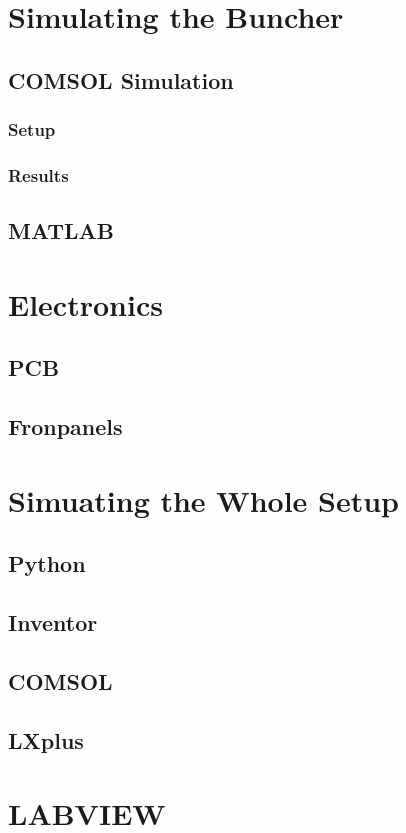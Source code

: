 \documentclass{article}
\begin{document}
\section{Simulating the Buncher}
\subsection{COMSOL Simulation}
\subsubsection{Setup}
\subsubsection{Results}
\subsection{MATLAB}


\section{Electronics}
\subsection{PCB}
\subsection{Fronpanels}


\section{Simuating the Whole Setup}

\subsection{Python}
\subsection{Inventor}
\subsection{COMSOL}
\subsection{LXplus}


\section{LABVIEW}
\end{document}
